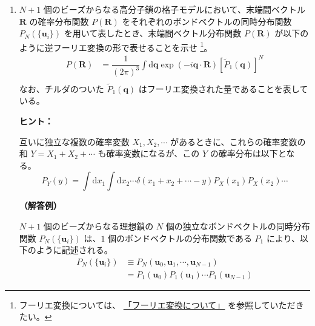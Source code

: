 \documentclass[uplatex,dvipdfmx,a4paper,11pt]{jsarticle}
\newcommand{\diff}{\mathrm d}
\begin{document}
\newpage 

\begin{enumerate}
\item
$N+1$ 個のビーズからなる高分子鎖の格子モデルにおいて、末端間ベクトル $\bm{R}$ の確率分布関数 $P(\bm{R})$ をそれぞれのボンドベクトルの同時分布関数 $P_N(\{\bm{u}_i\})$ を用いて表したとき、末端間ベクトル分布関数 $P(\bm{R})$ が以下のように逆フーリエ変換の形で表せることを示せ
\footnote
{
フーリエ変換については、
\href{https://dl.dropboxusercontent.com/u/18899343/Math/Fourier_Transform_2014_0321.pdf}{「フーリエ変換について」}
を参照していただきたい。
}。
\begin{align*}
P(\bm{R}) 
	&= \dfrac{1}{(2 \pi)^3} \int \diff \bm{q} \exp \left( -i \bm{q} \cdot \bm{R} \right) \left[\tilde{P}_1 (\bm{q}) \right]^N \\
\end{align*}
なお、チルダのついた $\tilde{P}_1 (\bm{q})$ はフーリエ変換された量であることを表している。


\begin{itembox}[l]{{\bf ヒント：}}

互いに独立な複数の確率変数 $X_1, X_2, \cdots$ があるときに、これらの確率変数の和 $Y=X_1 + X_2 + \cdots$ も確率変数になるが、この $Y$ の確率分布は以下となる。
\begin{equation*}
P_Y(y) = \int \diff x_1 \int \diff x_2 \cdots \delta (x_1 + x_2 + \cdots -y) P_X(x_1) P_X(x_2) \cdots
\end{equation*}
\end{itembox}

\vspace{10pt}
{\bf （解答例）}

$N+1$ 個のビーズからなる理想鎖の $N$ 個の独立なボンドベクトルの同時分布関数 $P_N(\{\bm{u}_i\})$ は、$1$ 個のボンドベクトルの分布関数である $P_1$ により、以下のように記述される。
\begin{align*}
P_N(\{\bm{u}_i\}) 
	&\equiv P_N(\bm{u}_0, \bm{u}_1, \cdots, \bm{u}_{N-1})\\
	&= P_1(\bm{u}_0) P_1(\bm{u}_1) \cdots P_1(\bm{u}_{N-1})
\end{align*}


\end{enumerate}
\end{document}

